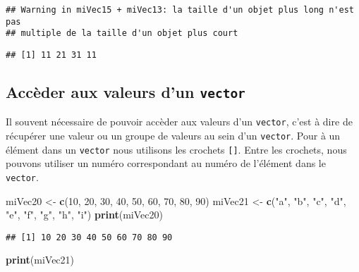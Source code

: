 \documentclass[]{book}
\newenvironment{Shaded}{\begin{snugshade}}{\end{snugshade}}
\newcommand{\KeywordTok}[1]{\textcolor[rgb]{0.13,0.29,0.53}{\textbf{#1}}}
\newcommand{\DecValTok}[1]{\textcolor[rgb]{0.00,0.00,0.81}{#1}}
\newcommand{\StringTok}[1]{\textcolor[rgb]{0.31,0.60,0.02}{#1}}
\newcommand{\NormalTok}[1]{#1}
\theoremstyle{definition}
\theoremstyle{definition}
\theoremstyle{definition}
\theoremstyle{remark}
\begin{document}
\begin{verbatim}
## Warning in miVec15 + miVec13: la taille d'un objet plus long n'est pas
## multiple de la taille d'un objet plus court
\end{verbatim}

\begin{verbatim}
## [1] 11 21 31 11
\end{verbatim}

\subsection{\texorpdfstring{Accèder aux valeurs d'un
\texttt{vector}}{Accèder aux valeurs d'un vector}}\label{acceder-aux-valeurs-dun-vector}

Il souvent nécessaire de pouvoir accèder aux valeurs d'un
\texttt{vector}, c'est à dire de récupérer une valeur ou un groupe de
valeurs au sein d'un \texttt{vector}. Pour à un élément dans un
\texttt{vector} nous utilisons les crochets \texttt{{[}{]}}. Entre les
crochets, nous pouvons utiliser un numéro correspondant au numéro de
l'élément dans le \texttt{vector}.

\begin{Shaded}
\begin{Highlighting}[]
\NormalTok{miVec20 <-}\StringTok{ }\KeywordTok{c}\NormalTok{(}\DecValTok{10}\NormalTok{, }\DecValTok{20}\NormalTok{, }\DecValTok{30}\NormalTok{, }\DecValTok{40}\NormalTok{, }\DecValTok{50}\NormalTok{, }\DecValTok{60}\NormalTok{, }\DecValTok{70}\NormalTok{, }\DecValTok{80}\NormalTok{, }\DecValTok{90}\NormalTok{)}
\NormalTok{miVec21 <-}\StringTok{ }\KeywordTok{c}\NormalTok{(}\StringTok{"a"}\NormalTok{, }\StringTok{"b"}\NormalTok{, }\StringTok{"c"}\NormalTok{, }\StringTok{"d"}\NormalTok{, }\StringTok{"e"}\NormalTok{, }\StringTok{"f"}\NormalTok{, }\StringTok{"g"}\NormalTok{, }\StringTok{"h"}\NormalTok{, }\StringTok{"i"}\NormalTok{)}
\KeywordTok{print}\NormalTok{(miVec20)}
\end{Highlighting}
\end{Shaded}

\begin{verbatim}
## [1] 10 20 30 40 50 60 70 80 90
\end{verbatim}

\begin{Shaded}
\begin{Highlighting}[]
\KeywordTok{print}\NormalTok{(miVec21)}
\end{Highlighting}
\end{Shaded}
\end{document}

